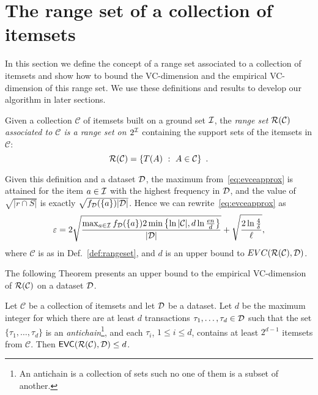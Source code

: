 \section{The range set of a collection of itemsets}\label{sec:range}
In this section we define the concept of a range set associated to a
collection of itemsets and show how to bound the VC-dimension and the
empirical VC-dimension of this range set. We use these definitions and results
to develop our algorithm in later sections.

\begin{definition}\label{def:rangeset}
Given a collection $\mathcal{C}$ of itemsets built on a ground set ${\cal I}$, the
\emph{range set $\mathcal{R}(\mathcal{C})$ associated to $\mathcal{C}$ is a range
set on $2^{\cal I}$} containing the support sets of the itemsets in $\mathcal{C}$:
\[
	\mathcal{R}(\mathcal{C})=\{T(A) ~:~ A\in\mathcal{C}\}\enspace.
\]
\end{definition}

\begin{fact}\label{fact:maxfreq}
	Given this definition and a dataset ${\cal D}$, the maximum
	from~\eqref{eq:evceapprox} is attained for the item $a\in{\cal I}$ with the
	highest frequency in ${\cal D}$, and the value of $\sqrt{|r\cap S|}$ is exactly
	$\sqrt{f_{\cal D}(\{a\})|{\cal D}|}$. Hence we can rewrite~\eqref{eq:evceapprox} as
	\begin{equation}\label{eq:evceapproxitemsets}
		\varepsilon =
		2\sqrt{\frac{\max_{a\in{\cal I}}f_{\cal D}(\{a\})2\min\left\{\ln|\mathcal{C}|,d\ln\frac{en}{d}\right\}}{|{\cal D}|}} +
		\sqrt{\frac{2\ln\frac{4}{\delta}}{\ell}},
	\end{equation}
	where $\mathcal{C}$ is as in Def.~\ref{def:rangeset}, and $d$ is an
	upper bound to $EVC(\mathcal{R}(\mathcal{C}),{\cal D})$.
\end{fact}

The following Theorem presents an upper bound to the empirical VC-dimension of
$\mathcal{R}(\mathcal{C})$ on a dataset ${\cal D}$.

\begin{theorem}\label{lem:evcdimupbound}
  Let $\mathcal{C}$ be a collection of itemsets and let ${\cal D}$ be a dataset. Let
  $d$ be the maximum integer for which there are at least $d$
  transactions $\tau_1,\dotsc,\tau_d\in {\cal D}$ such that the set
  $\{\tau_1,\dotsc,\tau_d\}$ is an \emph{antichain}\footnote{An antichain is a
  collection of sets such no one of them is a subset of another.}, and each $\tau_i$, $1\le i\le d$,
  contains at least $2^{d-1}$ itemsets from $\mathcal{C}$.
  Then $\mathsf{EVC}(\mathcal{R}(\mathcal{C}),{\cal D})\le d$.
\end{theorem}

